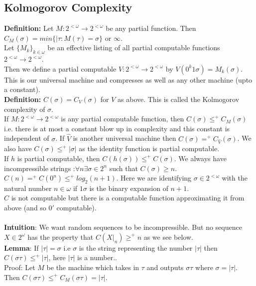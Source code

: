 \documentclass{article}
\begin{document}
	\subsection{Kolmogorov Complexity}
	\textbf{Definition:} Let $M: 2^{<\omega} \to 2^{< \omega}$ be any partial function. Then $C_M(\sigma) = min\{ |\tau :  M(\tau)=\sigma \}$ or $\infty$.
	\\
	Let $\{M_k\}_{k\in \omega}$ be an effective listing of all partial computable functions $2^{<\omega} \to 2^{< \omega}$. \\
	Then we define a partial computable $V: 2^{<\omega} \to 2^{< \omega}$ by $V(0^k1 \sigma) = M_k(\sigma)$. This is our universal machine and compresses as well as any other machine (upto a constant).\\
	\textbf{Definition:} $C(\sigma) = C_V(\sigma)$ for $V$ as above. This is called the Kolmogorov complexity of $\sigma$.
	\\
	If $M: 2^{<\omega} \to 2^{<\omega}$ is any partial computable function, then $C(\sigma) \leq^+ C_M(\sigma)$ i.e. there is at most a constant blow up in complexity and this constant is independent of $\sigma$. If $\hat{V}$ is another universal machine then $C(\sigma) =^+ C_{\hat{V}}(\sigma)$. We also have $C(\sigma) \leq^+ |\sigma|$ as the identity function is partial computable.\\
	If $h$ is partial computable, then $C(h(\sigma)) \leq^+ C(\sigma)$. We always have incompressible strings :$\forall n \exists \sigma \in 2^n$ such that $C(\sigma) \geq n$. \\
	$C(n) =^+ C(0^n) \leq^+ log_2(n+1)$. Here we are identifying $\sigma \in 2^{< \omega}$ with the natural number $n \in \omega$ if $1\sigma$ is the binary expansion of $n+1$.\\
	$C$ is not computable but there is a computable function approximating it from above (and so $0'$ computable).\\
	\\
	\textbf{Intuition}: We want random sequences to be incompressible. But no sequence $X \in 2^\omega$ has the property that $C(X|_n)\geq^+ n$ as we see below.\\
	\textbf{Lemma}: If $|\tau| = \sigma$ i.e $\sigma$ is the string representing the number $|\tau|$ then $C(\sigma \tau) \leq^+ |\tau|$, here $|\tau|$ is a number..\\
	Proof: Let $M$ be the machine which takes in $\tau$ and outputs $\sigma \tau$ where $\sigma = | \tau|$. Then $C(\sigma \tau) \leq^+ C_M(\sigma \tau) = |\tau|$.
	\\
\end{document}
